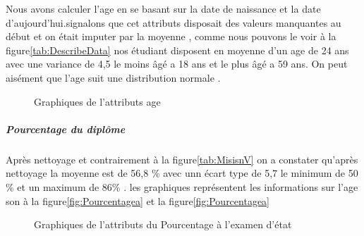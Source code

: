 Nous avons calculer l'age en se basant sur la date de naissance et la date d'aujourd'hui.signalons que cet attributs disposait des valeurs manquantes au début et on était imputer par la moyenne , comme nous pouvons le voir à la figure\ref{tab:DescribeData}  nos étudiant disposent en moyenne d'un age de 24 ans avec une variance de 4,5 le moins âgé a 18 ans et le plus âgé a 59 ans.
On peut aisément que l'age suit une distribution normale . 
\begin{figure}[!htbp]
	\centering
	\hfill
	\hfill
	\caption{Graphiques de l'attributs age}
\end{figure}
\subparagraph{Pourcentage du diplôme}
Après nettoyage et contrairement à la figure\ref{tab:MisisnV} on a constater qu'après nettoyage la moyenne est de 56,8 \% avec unn écart type de 5,7 le minimum de 50 \% et un maximum de 86\% .
les graphiques représentent les informations sur l'age  son à la figure\ref{fig:Pourcentagea} et la figure\ref{fig:Pourcentagea}
\begin{figure}[!htbp]
	\centering
	\hfill
	\hfill
	\caption{Graphiques de l'attributs du Pourcentage à l'examen d'état }
\end{figure}
